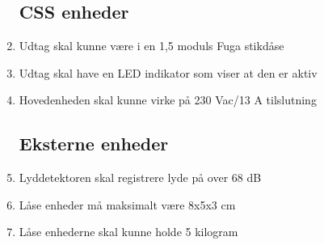 \begin{enumerate}
	\subsection*{CSS enheder}
	\item Udtag skal kunne være i en 1,5 moduls Fuga stikdåse
	\item Udtag skal have en LED indikator som viser at den er aktiv
	\item Hovedenheden skal kunne virke på 230 Vac/13 A tilslutning

	\subsection*{Eksterne enheder}
	\item Lyddetektoren skal registrere lyde på over 68 dB
	\item Låse enheder må maksimalt være 8x5x3 cm
	\item Låse enhederne skal kunne holde 5 kilogram

\end{enumerate}
